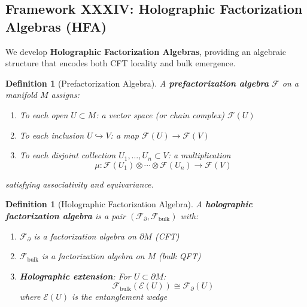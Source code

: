 \documentclass[12pt,a4paper]{article}
\newtheorem{definition}[theorem]{Definition}
\begin{document}
\subsection{Framework XXXIV: Holographic Factorization Algebras (HFA)}
\label{subsec:holographic-factorization-algebras}

We develop \textbf{Holographic Factorization Algebras}, providing an algebraic structure that encodes both CFT locality and bulk emergence.

\begin{definition}[Prefactorization Algebra]\label{def:prefact-algebra}
A \textbf{prefactorization algebra} $\mathcal{F}$ on a manifold $M$ assigns:
\begin{enumerate}
    \item To each open $U \subset M$: a vector space (or chain complex) $\mathcal{F}(U)$
    \item To each inclusion $U \hookrightarrow V$: a map $\mathcal{F}(U) \to \mathcal{F}(V)$
    \item To each disjoint collection $U_1, \ldots, U_n \subset V$: a multiplication
    \begin{equation}
    \mu: \mathcal{F}(U_1) \otimes \cdots \otimes \mathcal{F}(U_n) \to \mathcal{F}(V)
    \end{equation}
\end{enumerate}
satisfying associativity and equivariance.
\end{definition}

\begin{definition}[Holographic Factorization Algebra]\label{def:holo-fact-algebra}
A \textbf{holographic factorization algebra} is a pair $(\mathcal{F}_{\partial}, \mathcal{F}_{\text{bulk}})$ with:
\begin{enumerate}
    \item $\mathcal{F}_{\partial}$ is a factorization algebra on $\partial M$ (CFT)
    \item $\mathcal{F}_{\text{bulk}}$ is a factorization algebra on $M$ (bulk QFT)
    \item \textbf{Holographic extension}: For $U \subset \partial M$:
    \begin{equation}
    \mathcal{F}_{\text{bulk}}(\mathcal{E}(U)) \cong \mathcal{F}_{\partial}(U)
    \end{equation}
    where $\mathcal{E}(U)$ is the entanglement wedge
\end{enumerate}
\end{definition}
\end{document}
